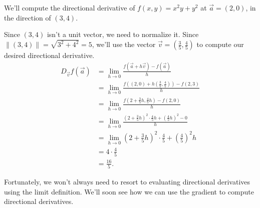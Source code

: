 \documentclass{ximera}
\begin{document}
\begin{example}
We'll compute the directional derivative of $f(x,y) = x^2y+y^2$ at $\vec{a}=(2,0)$, in the direction of $(3,4)$.

Since $(3,4)$ isn't a unit vector, we need to normalize it. Since $\|(3,4)\| = \sqrt{3^2+4^2}=5$, we'll use the vector $\vec{v}=\left(\frac{3}{5},\frac{4}{5}\right)$ to compute our desired directional derivative.
\begin{align*}
D_{\vec{v}}f(\vec{a}) &= \lim_{h\rightarrow 0}\frac{f(\vec{a}+h\vec{v})-f(\vec{a})}{h}\\
&= \lim_{h\rightarrow 0}\frac{f\left((2,0) + h\left(\frac{3}{5},\frac{4}{5}\right)\right)-f(2,3)}{h}\\
&= \lim_{h\rightarrow 0}\frac{f\left(2+\frac{3}{5}h,\frac{4}{5}h \right)-f(2,0)}{h}\\
&= \lim_{h\rightarrow 0}\frac{\left(2+\frac{3}{5}h\right)^2\cdot \frac{4}{5}h + \left(\frac{4}{5}h\right)^2-0}{h}\\
&= \lim_{h\rightarrow 0}\left(2+\frac{3}{5}h\right)^2\cdot \frac{4}{5} + \left(\frac{4}{5}\right)^2h\\
&= 4\cdot \frac{4}{5}\\
&= \frac{16}{5}.
\end{align*}
\end{example}

Fortunately, we won't always need to resort to evaluating directional derivatives using the limit definition. We'll soon see how we can use the gradient to compute directional derivatives.
\end{document}
